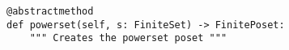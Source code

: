 \par\begin{minipage}{60ex}
\begin{verbatim}
@abstractmethod
def powerset(self, s: FiniteSet) -> FinitePoset:
    """ Creates the powerset poset """
\end{verbatim}
\end{minipage}\par